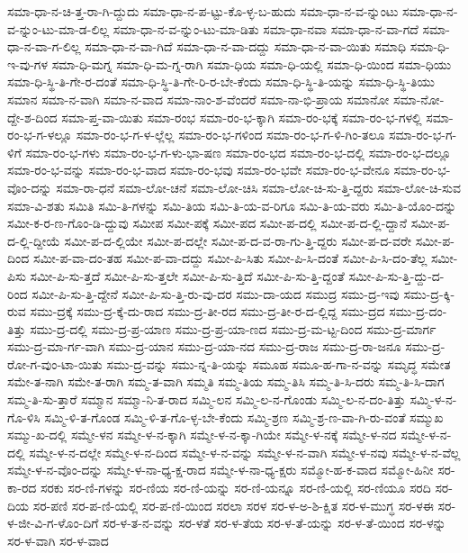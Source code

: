 {ಸಮಾ-ಧಾ-ನ-ಚಿ-ತ್ತ-ರಾ-ಗಿ-ದ್ದುದು
ಸಮಾ-ಧಾ-ನ-ಪ-ಟ್ಟು-ಕೊ-ಳ್ಳ-ಬ-ಹುದು
ಸಮಾ-ಧಾ-ನ-ವ-ನ್ನುಂಟು
ಸಮಾ-ಧಾ-ನ-ವ-ನ್ನುಂ-ಟು-ಮಾ-ಡ-ಲಿಲ್ಲ
ಸಮಾ-ಧಾ-ನ-ವ-ನ್ನುಂ-ಟು-ಮಾ-ಡಿತು
ಸಮಾ-ಧಾ-ನವಾ
ಸಮಾ-ಧಾ-ನ-ವಾ-ಗದೆ
ಸಮಾ-ಧಾ-ನ-ವಾ-ಗ-ಲಿಲ್ಲ
ಸಮಾ-ಧಾ-ನ-ವಾ-ಗಿದೆ
ಸಮಾ-ಧಾ-ನ-ವಾ-ದದ್ದು
ಸಮಾ-ಧಾ-ನ-ವಾ-ಯಿತು
ಸಮಾಧಿ
ಸಮಾ-ಧಿ-ಇ-ವು-ಗಳ
ಸಮಾ-ಧಿ-ಮಗ್ನ
ಸಮಾ-ಧಿ-ಮ-ಗ್ನ-ರಾಗಿ
ಸಮಾ-ಧಿಯ
ಸಮಾ-ಧಿ-ಯಲ್ಲಿ
ಸಮಾ-ಧಿ-ಯಿಂದ
ಸಮಾ-ಧಿಯು
ಸಮಾ-ಧಿ-ಸ್ಥಿ-ತಿ-ಗೇ-ರ-ದಂತೆ
ಸಮಾ-ಧಿ-ಸ್ಥಿ-ತಿ-ಗೇ-ರಿ-ರ-ಬೇ-ಕೆಂದು
ಸಮಾ-ಧಿ-ಸ್ಥಿ-ತಿ-ಯನ್ನು
ಸಮಾ-ಧಿ-ಸ್ಥಿ-ತಿಯು
ಸಮಾನ
ಸಮಾ-ನ-ವಾಗಿ
ಸಮಾ-ನ-ವಾದ
ಸಮಾ-ನಾಂ-ಶ-ವೆಂದರೆ
ಸಮಾ-ನಾ-ಭಿ-ಪ್ರಾಯ
ಸಮಾನೋ
ಸಮಾ-ನೋ-ದ್ದೇ-ಶ-ದಿಂದ
ಸಮಾ-ಪ್ತ-ವಾ-ಯಿತು
ಸಮಾ-ರಂಭ
ಸಮಾ-ರಂ-ಭ-ಕ್ಕಾಗಿ
ಸಮಾ-ರಂ-ಭಕ್ಕೆ
ಸಮಾ-ರಂ-ಭ-ಗಳಲ್ಲಿ
ಸಮಾ-ರಂ-ಭ-ಗ-ಳಲ್ಲೂ
ಸಮಾ-ರಂ-ಭ-ಗ-ಳ-ಲ್ಲೆಲ್ಲ
ಸಮಾ-ರಂ-ಭ-ಗಳಿಂದ
ಸಮಾ-ರಂ-ಭ-ಗ-ಳಿ-ಗಿಂ-ತಲೂ
ಸಮಾ-ರಂ-ಭ-ಗ-ಳಿಗೆ
ಸಮಾ-ರಂ-ಭ-ಗಳು
ಸಮಾ-ರಂ-ಭ-ಗ-ಳು-ಭಾ-ಷಣ
ಸಮಾ-ರಂ-ಭದ
ಸಮಾ-ರಂ-ಭ-ದಲ್ಲಿ
ಸಮಾ-ರಂ-ಭ-ದಲ್ಲೂ
ಸಮಾ-ರಂ-ಭ-ವನ್ನು
ಸಮಾ-ರಂ-ಭ-ವಾದ
ಸಮಾ-ರಂ-ಭವು
ಸಮಾ-ರಂ-ಭವೇ
ಸಮಾ-ರಂ-ಭ-ವೇನೂ
ಸಮಾ-ರಂ-ಭ-ವೊಂ-ದನ್ನು
ಸಮಾ-ರಾ-ಧನೆ
ಸಮಾ-ಲೋ-ಚನೆ
ಸಮಾ-ಲೋ-ಚಿಸಿ
ಸಮಾ-ಲೋ-ಚಿ-ಸು-ತ್ತಿ-ದ್ದರು
ಸಮಾ-ಲೋ-ಚಿ-ಸುವ
ಸಮಾ-ವಿ-ಶತು
ಸಮಿತಿ
ಸಮಿ-ತಿ-ಗಳನ್ನು
ಸಮಿ-ತಿಯ
ಸಮಿ-ತಿ-ಯ-ವ-ರಿಗೂ
ಸಮಿ-ತಿ-ಯ-ವರು
ಸಮಿ-ತಿ-ಯೊಂ-ದನ್ನು
ಸಮೀ-ಕ-ರ-ಣ-ಗೊಂ-ಡಿ-ದ್ದುವು
ಸಮೀಪ
ಸಮೀ-ಪಕ್ಕೆ
ಸಮೀ-ಪದ
ಸಮೀ-ಪ-ದಲ್ಲಿ
ಸಮೀ-ಪ-ದ-ಲ್ಲಿ-ದ್ದಾನೆ
ಸಮೀ-ಪ-ದ-ಲ್ಲಿ-ದ್ದೀಯೆ
ಸಮೀ-ಪ-ದ-ಲ್ಲಿಯೇ
ಸಮೀ-ಪ-ದಲ್ಲೇ
ಸಮೀ-ಪ-ದ-ವ-ರಾ-ಗು-ತ್ತಿ-ದ್ದರು
ಸಮೀ-ಪ-ದ-ವರೇ
ಸಮೀ-ಪ-ದಿಂದ
ಸಮೀ-ಪ-ವಾ-ದಂ-ತಹ
ಸಮೀ-ಪ-ವಾ-ದದ್ದು
ಸಮೀ-ಪಿ-ಸಿತು
ಸಮೀ-ಪಿ-ಸಿ-ದಂತೆ
ಸಮೀ-ಪಿ-ಸಿ-ದಂ-ತೆಲ್ಲ
ಸಮೀ-ಪಿಸು
ಸಮೀ-ಪಿ-ಸು-ತ್ತದೆ
ಸಮೀ-ಪಿ-ಸು-ತ್ತಲೇ
ಸಮೀ-ಪಿ-ಸು-ತ್ತಿದೆ
ಸಮೀ-ಪಿ-ಸು-ತ್ತಿ-ದ್ದಂತೆ
ಸಮೀ-ಪಿ-ಸು-ತ್ತಿ-ದ್ದು-ದ-ರಿಂದ
ಸಮೀ-ಪಿ-ಸು-ತ್ತಿ-ದ್ದೇನೆ
ಸಮೀ-ಪಿ-ಸು-ತ್ತಿ-ರು-ವು-ದರ
ಸಮು-ದಾ-ಯದ
ಸಮುದ್ರ
ಸಮು-ದ್ರ-ಇವು
ಸಮು-ದ್ರ-ಕ್ಕಿ-ರುವ
ಸಮು-ದ್ರಕ್ಕೆ
ಸಮು-ದ್ರ-ಕ್ಕೆ-ದು-ರಾದ
ಸಮು-ದ್ರ-ತೀ-ರದ
ಸಮು-ದ್ರ-ತೀ-ರ-ದ-ಲ್ಲಿದ್ದ
ಸಮು-ದ್ರದ
ಸಮು-ದ್ರ-ದಂ-ತಿತ್ತು
ಸಮು-ದ್ರ-ದಲ್ಲಿ
ಸಮು-ದ್ರ-ಪ್ರ-ಯಾಣ
ಸಮು-ದ್ರ-ಪ್ರ-ಯಾ-ಣದ
ಸಮು-ದ್ರ-ಮ-ಟ್ಟ-ದಿಂದ
ಸಮು-ದ್ರ-ಮಾರ್ಗ
ಸಮು-ದ್ರ-ಮಾ-ರ್ಗ-ವಾಗಿ
ಸಮು-ದ್ರ-ಯಾನ
ಸಮು-ದ್ರ-ಯಾ-ನದ
ಸಮು-ದ್ರ-ರಾಜ
ಸಮು-ದ್ರ-ರಾ-ಜನೂ
ಸಮು-ದ್ರ-ರೋ-ಗ-ವುಂ-ಟಾ-ಯಿತು
ಸಮು-ದ್ರ-ವನ್ನು
ಸಮು-ನ್ನ-ತಿ-ಯನ್ನು
ಸಮೂಹ
ಸಮೂ-ಹ-ಗಾ-ನ-ವನ್ನು
ಸಮೃದ್ಧ
ಸಮೇತ
ಸಮೇ-ತ-ನಾಗಿ
ಸಮೇ-ತ-ರಾಗಿ
ಸಮ್ಮ-ತ-ವಾಗಿ
ಸಮ್ಮತಿ
ಸಮ್ಮ-ತಿಯ
ಸಮ್ಮ-ತಿಸಿ
ಸಮ್ಮ-ತಿ-ಸಿ-ದರು
ಸಮ್ಮ-ತಿ-ಸಿ-ದಾಗ
ಸಮ್ಮ-ತಿ-ಸು-ತ್ತಾರೆ
ಸಮ್ಮಾನ
ಸಮ್ಮಾ-ನಿ-ತ-ರಾದ
ಸಮ್ಮಿ-ಲನ
ಸಮ್ಮಿ-ಲ-ನ-ಗೊಂಡು
ಸಮ್ಮಿ-ಲ-ನ-ದಂ-ತಿತ್ತು
ಸಮ್ಮಿ-ಳ-ನ-ಗೊ-ಳಿಸಿ
ಸಮ್ಮಿ-ಳಿ-ತ-ಗೊಂಡ
ಸಮ್ಮಿ-ಳಿ-ತ-ಗೊ-ಳ್ಳ-ಬೇ-ಕೆಂದು
ಸಮ್ಮಿ-ಶ್ರಣ
ಸಮ್ಮಿ-ಶ್ರ-ಣ-ವಾ-ಗಿ-ರು-ವಂತೆ
ಸಮ್ಮುಖ
ಸಮ್ಮು-ಖ-ದಲ್ಲಿ
ಸಮ್ಮೇ-ಳನ
ಸಮ್ಮೇ-ಳ-ನ-ಕ್ಕಾಗಿ
ಸಮ್ಮೇ-ಳ-ನ-ಕ್ಕಾ-ಗಿಯೇ
ಸಮ್ಮೇ-ಳ-ನಕ್ಕೆ
ಸಮ್ಮೇ-ಳ-ನದ
ಸಮ್ಮೇ-ಳ-ನ-ದಲ್ಲಿ
ಸಮ್ಮೇ-ಳ-ನ-ದಲ್ಲೇ
ಸಮ್ಮೇ-ಳ-ನ-ದಿಂದ
ಸಮ್ಮೇ-ಳ-ನ-ವನ್ನು
ಸಮ್ಮೇ-ಳ-ನ-ವಾಗಿ
ಸಮ್ಮೇ-ಳ-ನವು
ಸಮ್ಮೇ-ಳ-ನ-ವೆಲ್ಲ
ಸಮ್ಮೇ-ಳ-ನ-ವೊಂ-ದನ್ನು
ಸಮ್ಮೇ-ಳ-ನಾ-ಧ್ಯ-ಕ್ಷ-ರಾದ
ಸಮ್ಮೇ-ಳ-ನಾ-ಧ್ಯ-ಕ್ಷರು
ಸಮ್ಮೋ-ಹ-ಕ-ವಾದ
ಸಮ್ಮೋ-ಹಿನೀ
ಸರ-ಕಾ-ರದ
ಸರಕು
ಸರ-ಣಿ-ಗಳನ್ನು
ಸರ-ಣಿಯ
ಸರ-ಣಿ-ಯನ್ನು
ಸರ-ಣಿ-ಯನ್ನೂ
ಸರ-ಣಿ-ಯಲ್ಲಿ
ಸರ-ಣಿಯೂ
ಸರದಿ
ಸರ-ದಿಯ
ಸರ-ಪಣಿ
ಸರ-ಪ-ಣಿ-ಯಲ್ಲಿ
ಸರ-ಪ-ಣಿ-ಯಿಂದ
ಸರಲಾ
ಸರಳ
ಸರ-ಳ-ಅ-ಶಿ-ಕ್ಷಿತ
ಸರ-ಳ-ಮುಗ್ಧ
ಸರ-ಳಈ
ಸರ-ಳ-ಜೀ-ವಿ-ಗ-ಳೊಂ-ದಿಗೆ
ಸರ-ಳ-ತ-ನ-ವನ್ನು
ಸರ-ಳತೆ
ಸರ-ಳ-ತೆಯ
ಸರ-ಳ-ತೆ-ಯನ್ನು
ಸರ-ಳ-ತೆ-ಯಿಂದ
ಸರ-ಳನ್ನು
ಸರ-ಳ-ವಾಗಿ
ಸರ-ಳ-ವಾದ
}
